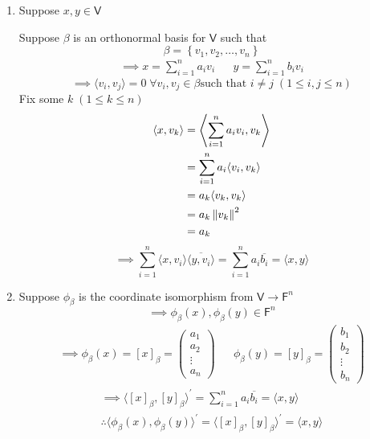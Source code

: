\begin{enumerate}
\item Suppose $x,y \in \mathsf{V}$

Suppose $\beta$ is an orthonormal basis for $\mathsf{V}$ such that
\begin{equation}
\beta = \left\{v_1,v_2,\dotsc,v_n\right\}
\end{equation}
\begin{align}
\implies x = \sum\limits_{i=1}^n a_iv_i & & y = \sum\limits_{i=1}^n b_iv_i
\end{align}
\begin{equation}
\implies \langle v_i,v_j \rangle = 0\; \forall v_i,v_j \in \beta \text{
  such that } i\neq j \; (1\leq i,j \leq n)
\end{equation}
Fix some $k \; (1 \leq k \leq n)$
\begin{align}
\langle x,v_k \rangle &= \left \langle \sum\limits_{i=1}^n
  a_iv_i,v_k\right\rangle \\
&= \sum\limits_{i=1}^n a_i \langle v_i,v_k \rangle\\
&= a_k \langle v_k, v_k \rangle\\
&= a_k \left\lVert v_k\right\rVert^2\\
&= a_k
\end{align}
\begin{equation}
\implies \sum\limits_{i=1}^n \langle x,v_i \rangle \overline{\langle
  y,v_i\rangle} = \sum\limits_{i=1}^n a_i\overline{b_i} = \langle x,y\rangle
\end{equation}
\item Suppose $\phi_\beta$ is the coordinate isomorphism from
  $\mathsf{V} \to \mathsf{F}^n$
\begin{equation}
\implies \phi_\beta(x),\phi_\beta(y) \in \mathsf{F}^n
\end{equation}
\begin{align}
\implies \phi_\beta(x) = [x]_\beta
= \begin{pmatrix}a_1\\a_2\\\vdots\\a_n\end{pmatrix} & & \phi_\beta(y)
= [y]_\beta = \begin{pmatrix}b_1\\b_2\\\vdots\\b_n\end{pmatrix}
\end{align}
\begin{gather}
\implies \langle [x]_\beta,[y]_\beta\rangle^\prime =
\sum\limits_{i=1}^n a_i\overline{b_i} = \langle x,y \rangle\\
\therefore \langle \phi_\beta(x) , \phi_\beta(y) \rangle^\prime =
\langle [x]_\beta, [y]_\beta \rangle^\prime = \langle x,y\rangle
\end{gather}
\end{enumerate}
